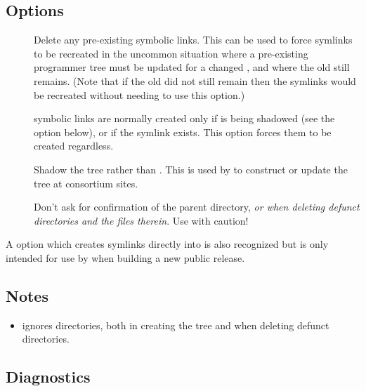 \subsection*{Options}

\begin{description}
\item[]
   Delete any pre-existing symbolic links.  This can be used to force symlinks
   to be recreated in the uncommon situation where a pre-existing programmer
   tree must be updated for a changed , and where the old
    still remains.  (Note that if the old  did
   not still remain then the symlinks would be recreated without needing to
   use this option.)

\item[]
    symbolic links are normally created only if  is
   being shadowed (see the  option below), or if the
    symlink exists.  This option forces them to be
   created regardless.

\item[]
   Shadow the  tree rather than .  This is
   used by  to construct or update the  tree
   at consortium sites.

\item[]
   Don't ask for confirmation of the parent directory, {\em or when deleting
   defunct directories and the files therein}.  Use with caution!
\end{description}

A  option which creates  symlinks directly into
 is also recognized but is only intended for use by
 when building a new public release.

\subsection*{Notes}
 
\begin{itemize}
\item
    ignores  directories, both in creating the tree
   and when deleting defunct directories.
\end{itemize}

\subsection*{Diagnostics}

